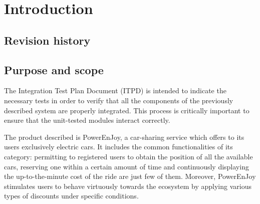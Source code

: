 \chapter{Introduction}

\section{Revision history}

\section{Purpose and scope}
The Integration Test Plan Document (ITPD) is intended to indicate the necessary tests in order to verify that all the components of the previously described system are properly integrated. This process is critically important to ensure that the unit-tested modules interact correctly.

The product described is PowerEnJoy, a car-sharing service which offers to its users exclusively electric cars. It includes the common functionalities of its category: permitting to registered users to obtain the position of all the available cars, reserving one within a certain amount of time and continuously displaying the up-to-the-minute cost of the ride are just few of them. Moreover, PowerEnJoy stimulates users to behave virtuously towards the ecosystem by applying various types of discounts under specific conditions.


